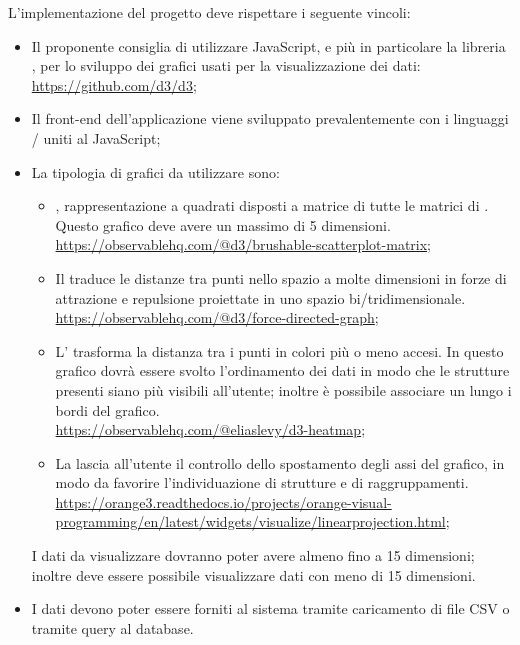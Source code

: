 \documentclass[../analisi-dei-requisiti.tex]{subfiles}
\begin{document}
L'implementazione del progetto deve rispettare i seguente vincoli:
\begin{itemize}
    \item Il proponente consiglia di utilizzare JavaScript, e più in particolare la libreria , per lo sviluppo dei grafici usati per la visualizzazione dei dati: \\ \url{https://github.com/d3/d3};
    \item Il front-end dell'applicazione viene sviluppato prevalentemente con i linguaggi / uniti al JavaScript;
    \item La tipologia di grafici da utilizzare sono:
    \begin{itemize}
        \item {}, rappresentazione a quadrati disposti a matrice di tutte le matrici di . Questo grafico deve avere un massimo di 5 dimensioni. \\ \url{https://observablehq.com/@d3/brushable-scatterplot-matrix};
        \item Il  traduce le distanze tra punti nello spazio a molte dimensioni in forze di attrazione e repulsione proiettate in uno spazio bi/tridimensionale. \\  \url{https://observablehq.com/@d3/force-directed-graph};
        \item L' trasforma la distanza tra i punti in colori più o meno accesi. In questo grafico dovrà essere svolto l'ordinamento dei dati in modo che le strutture presenti siano più visibili all'utente; inoltre è possibile associare un  lungo i bordi del grafico. \\ \url{https://observablehq.com/@eliaslevy/d3-heatmap}; 
        \item La  lascia all'utente il controllo dello spostamento degli assi del grafico, in modo da favorire l'individuazione di strutture e di raggruppamenti. \\ \url{https://orange3.readthedocs.io/projects/orange-visual-programming/en/latest/widgets/visualize/linearprojection.html};
    \end{itemize}
    I dati da visualizzare dovranno poter avere almeno fino a 15 dimensioni; inoltre deve essere possibile visualizzare dati con meno di 15 dimensioni. 
    \item I dati devono poter essere forniti al sistema tramite caricamento di file CSV o tramite query al database.
\end{itemize}
\end{document}

